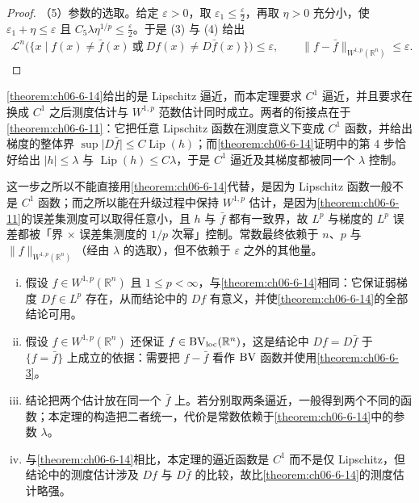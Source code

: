 \documentclass[../../main.tex]{subfiles}%
\begin{document}
\begin{proof}
（5）参数的选取。给定 $\varepsilon>0$，取 $\varepsilon_1\le\frac{\varepsilon}{2}$，再取 $\eta>0$ 充分小，使 $\varepsilon_1+\eta\le\varepsilon$ 且 $C_5\lambda\eta^{1/p}\le\frac{\varepsilon}{2}$。于是 (3) 与 (4) 给出
\begin{align*}
\mathcal{L}^n\bigl(\{x\mid f(x)\ne\bar f(x)\ \text{或}\ Df(x)\ne D\bar f(x)\}\bigr)\le\varepsilon,\qquad\lVert f-\bar f\rVert_{W^{1,p}(\mathbb{R}^n)}\le\varepsilon .
\end{align*}
\end{proof}

\begin{remark}\label{remark:ch06-thm-6-15-动机}
\cref{theorem:ch06-6-14}给出的是 Lipschitz 逼近，而本定理要求 $C^1$ 逼近，并且要求在换成 $C^1$ 之后测度估计与 $W^{1,p}$ 范数估计同时成立。两者的衔接点在于\cref{theorem:ch06-6-11}：它把任意 Lipschitz 函数在测度意义下变成 $C^1$ 函数，并给出梯度的整体界 $\sup\lvert D\bar f\rvert\le C\operatorname{Lip}(h)$；而\cref{theorem:ch06-6-14}证明中的第 4 步恰好给出 $\lvert h\rvert\le\lambda$ 与 $\operatorname{Lip}(h)\le C\lambda$，于是 $C^1$ 逼近及其梯度都被同一个 $\lambda$ 控制。%

这一步之所以不能直接用\cref{theorem:ch06-6-14}代替，是因为 Lipschitz 函数一般不是 $C^1$ 函数；而之所以能在升级过程中保持 $W^{1,p}$ 估计，是因为\cref{theorem:ch06-6-11}的误差集测度可以取得任意小，且 $h$ 与 $\bar f$ 都有一致界，故 $L^p$ 与梯度的 $L^p$ 误差都被「界 $\times$ 误差集测度的 $1/p$ 次幂」控制。常数最终依赖于 $n$、$p$ 与 $\lVert f\rVert_{W^{1,p}(\mathbb{R}^n)}$（经由 $\lambda$ 的选取），但不依赖于 $\varepsilon$ 之外的其他量。%
\end{remark}

\begin{remark}\label{remark:ch06-thm-6-15-条件}
\begin{enumerate}[(i)]
\item 假设 $f\in W^{1,p}(\mathbb{R}^n)$ 且 $1\le p<\infty$，与\cref{theorem:ch06-6-14}相同：它保证弱梯度 $Df\in L^p$ 存在，从而结论中的 $Df$ 有意义，并使\cref{theorem:ch06-6-14}的全部结论可用。%
\item 假设 $f\in W^{1,p}(\mathbb{R}^n)$ 还保证 $f\in\mathrm{BV}_{\mathrm{loc}}(\mathbb{R}^n)$，这是结论中 $Df=D\bar f$ 于 $\{f=\bar f\}$ 上成立的依据：需要把 $f-\bar f$ 看作 $\mathrm{BV}$ 函数并使用\cref{theorem:ch06-6-3}。%
\item 结论把两个估计放在同一个 $\bar f$ 上。若分别取两条逼近，一般得到两个不同的函数；本定理的构造把二者统一，代价是常数依赖于\cref{theorem:ch06-6-14}中的参数 $\lambda$。%
\item 与\cref{theorem:ch06-6-14}相比，本定理的逼近函数是 $C^1$ 而不是仅 Lipschitz，但结论中的测度估计涉及 $Df$ 与 $D\bar f$ 的比较，故比\cref{theorem:ch06-6-14}的测度估计略强。%
\end{enumerate}
\end{remark}
\end{document}
